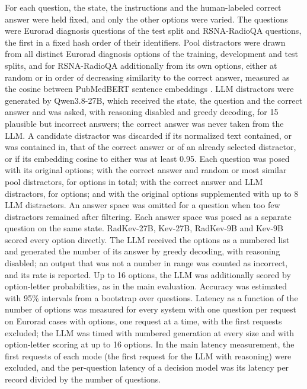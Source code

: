 \documentclass[11pt]{article}
\begin{document}
For each question, the state, the instructions and the human-labeled correct answer were held fixed, and only the other options were varied. The questions were  Eurorad diagnosis questions of the test split and  RSNA-RadioQA questions, the first in a fixed hash order of their identifiers. Pool distractors were drawn from all distinct Eurorad diagnosis options of the training, development and test splits, and for RSNA-RadioQA additionally from its own options, either at random or in order of decreasing similarity to the correct answer, measured as the cosine between PubMedBERT sentence embeddings \citep{gu2021pubmedbert}. LLM distractors were generated by Qwen3.8-27B, which received the state, the question and the correct answer and was asked, with reasoning disabled and greedy decoding, for 15 plausible but incorrect answers; the correct answer was never taken from the LLM. A candidate distractor was discarded if its normalized text contained, or was contained in, that of the correct answer or of an already selected distractor, or if its embedding cosine to either was at least 0.95. Each question was posed with its original options; with the correct answer and random or most similar pool distractors, for  options in total; with the correct answer and LLM distractors, for  options; and with the original options supplemented with up to 8 LLM distractors. An answer space was omitted for a question when too few distractors remained after filtering. Each answer space was posed as a separate question on the same state. RadKev-27B, Kev-27B, RadKev-9B and Kev-9B scored every option directly. The LLM received the options as a numbered list and generated the number of its answer by greedy decoding, with reasoning disabled; an output that was not a number in range was counted as incorrect, and its rate is reported. Up to 16 options, the LLM was additionally scored by option-letter probabilities, as in the main evaluation. Accuracy was estimated with 95\% intervals from a bootstrap over questions. Latency as a function of the number of options was measured for every system with one question per request on  Eurorad cases with  options, one request at a time, with the first  requests excluded; the LLM was timed with numbered generation at every size and with option-letter scoring at up to 16 options. In the main latency measurement, the first  requests of each mode (the first request for the LLM with reasoning) were excluded, and the per-question latency of a decision model was its latency per record divided by the number of questions.
\end{document}
